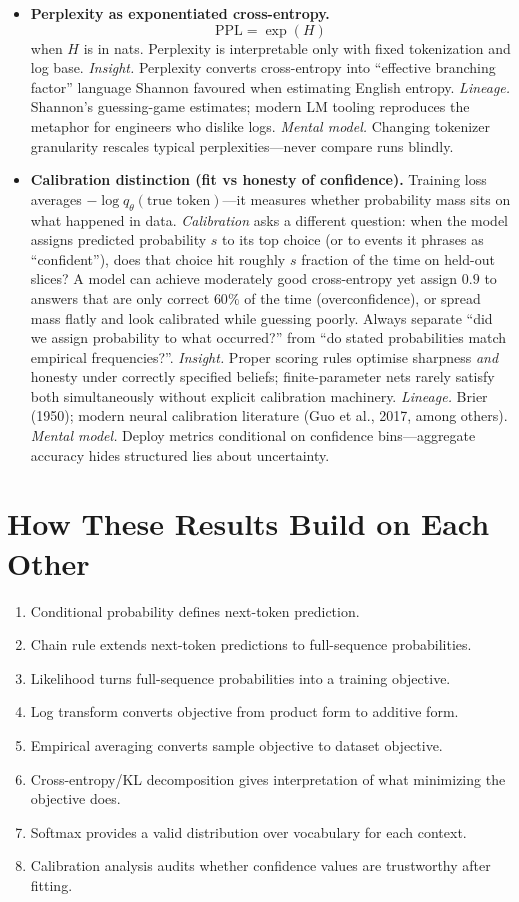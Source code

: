 \begin{itemize}[leftmargin=1.5em]
  \item \textbf{Perplexity as exponentiated cross-entropy.}
  \[
    \mathrm{PPL}=\exp(H)
  \]
  when $H$ is in nats. Perplexity is interpretable only with fixed tokenization and log base.
  \textit{Insight.} Perplexity converts cross-entropy into ``effective branching factor'' language Shannon favoured when estimating English entropy.
  \textit{Lineage.} Shannon's guessing-game estimates; modern LM tooling reproduces the metaphor for engineers who dislike logs.
  \textit{Mental model.} Changing tokenizer granularity rescales typical perplexities---never compare runs blindly.

  \item \textbf{Calibration distinction (fit vs honesty of confidence).}
  Training loss averages $-\log q_\theta(\text{true token})$---it measures whether probability mass sits on what happened in data. \emph{Calibration} asks a different question: when the model assigns predicted probability $s$ to its top choice (or to events it phrases as ``confident''), does that choice hit roughly $s$ fraction of the time on held-out slices? A model can achieve moderately good cross-entropy yet assign $0.9$ to answers that are only correct $60\%$ of the time (overconfidence), or spread mass flatly and look calibrated while guessing poorly. Always separate ``did we assign probability to what occurred?'' from ``do stated probabilities match empirical frequencies?''.
  \textit{Insight.} Proper scoring rules optimise sharpness \emph{and} honesty under correctly specified beliefs; finite-parameter nets rarely satisfy both simultaneously without explicit calibration machinery.
  \textit{Lineage.} Brier (1950); modern neural calibration literature (Guo et al., 2017, among others).
  \textit{Mental model.} Deploy metrics conditional on confidence bins---aggregate accuracy hides structured lies about uncertainty.
\end{itemize}

\section*{How These Results Build on Each Other}
\begin{enumerate}[leftmargin=1.5em]
  \item Conditional probability defines next-token prediction.
  \item Chain rule extends next-token predictions to full-sequence probabilities.
  \item Likelihood turns full-sequence probabilities into a training objective.
  \item Log transform converts objective from product form to additive form.
  \item Empirical averaging converts sample objective to dataset objective.
  \item Cross-entropy/KL decomposition gives interpretation of what minimizing the objective does.
  \item Softmax provides a valid distribution over vocabulary for each context.
  \item Calibration analysis audits whether confidence values are trustworthy after fitting.
\end{enumerate}

